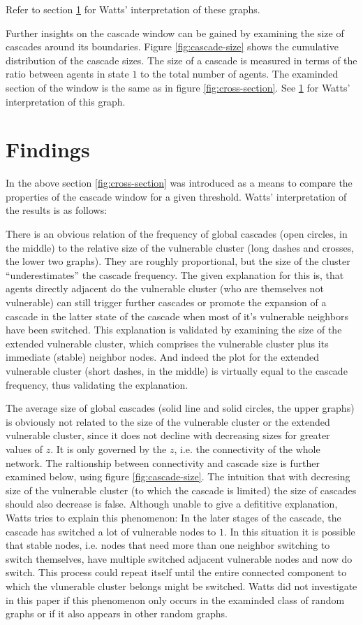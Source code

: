 \documentclass{sig-alternate-05-2015}
\begin{document}
Refer to section \ref{sec:findings} for Watts' interpretation of these graphs.

Further insights on the cascade window can be gained by examining the size of cascades around its boundaries. Figure \ref{fig:cascade-size} shows the cumulative distribution of the cascade sizes. The size of a cascade is measured in terms of the ratio between agents in state $1$ to the total number of agents. The examinded section of the window is the same as in figure \ref{fig:cross-section}. See \ref{sec:findings} for Watts' interpretation of this graph.


\section{Findings}\label{sec:findings}

In the above section \ref{fig:cross-section} was introduced as a means to compare the properties of the cascade window for a given threshold. Watts' interpretation of the results is as follows:

There is an obvious relation of the frequency of global cascades (open circles, in the middle) to the relative size of the vulnerable cluster (long dashes and crosses, the lower two graphs). They are roughly proportional, but the size of the cluster ``underestimates'' the cascade frequency. The given explanation for this is, that agents directly adjacent do the vulnerable cluster (who are themselves not vulnerable) can still trigger further cascades or promote the expansion of a cascade in the latter state of the cascade when most of it's vulnerable neighbors have been switched. This explanation is validated by examining the size of the extended vulnerable cluster, which comprises the vulnerable cluster plus its immediate (stable) neighbor nodes. And indeed the plot for the extended vulnerable cluster (short dashes, in the middle) is virtually equal to the cascade frequency, thus validating the explanation.

The average size of global cascades (solid line and solid circles, the upper graphs) is obviously not related to the size of the vulnerable cluster or the extended vulnerable cluster, since it does not decline with decreasing sizes for greater values of $z$. It is only governed by the $z$, i.e. the connectivity of the whole network. The raltionship between connectivity and cascade size is further examined below, using figure \ref{fig:cascade-size}. The intuition that with decresing size of the vulnerable cluster (to which the cascade is limited) the size of cascades should also decrease is false. Although unable to give a defititive explanation, Watts tries to explain this phenomenon: In the later stages of the cascade, the cascade has switched a lot of vulnerable nodes to $1$. In this situation it is possible that stable nodes, i.e. nodes that need more than one neighbor switching to switch themselves, have multiple switched adjacent vulnerable nodes and now do switch. This process could repeat itself until the entire connected component to which the vlunerable cluster belongs might be switched. Watts did not investigate in this paper if this phenomenon only occurs in the examinded class of random graphs or if it also appears in other random graphs.
\end{document}
